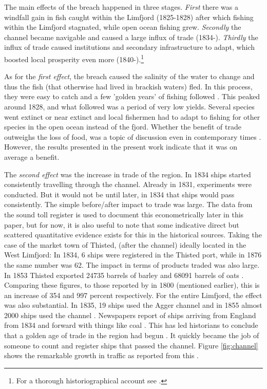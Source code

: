 \documentclass[11pt]{article}
\begin{document}
The main effects of the breach happened in three stages. \textit{First} there was a windfall gain in fish caught within the Limfjord (1825-1828) after which fishing within the Limfjord stagnated, while open ocean fishing grew. \textit{Secondly} the channel became navigable and caused a large influx of trade (1834-). \textit{Thirdly} the influx of trade caused institutions and secondary infrastructure to adapt, which boosted local prosperity even more (1840-).\footnote{For a thorough historiographical account see \cite{Poulsen2022}.}

As for the \textit{first effect}, the breach caused the salinity of the water to change and thus the fish (that otherwise had lived in brackish waters) fled. In this process, they were easy to catch and a few 'golden years' of fishing followed \citep{Poulsen2007}. This peaked around 1828, and what followed was a period of very low yields. Several species went extinct or near extinct \citep{Poulsen2019} and local fishermen had to adapt to fishing for other species in the open ocean instead of the fjord. Whether the benefit of trade outweighs the loss of food, was a topic of discussion even in contemporary times \citep[p. 1]{petersen1853oplysende}. However, the results presented in the present work indicate that it was on average a benefit.

The \textit{second effect} was the increase in trade of the region. In 1834 ships started consistently travelling through the channel. Already in 1831, experiments were conducted. But it would not be until later, in 1834 that ships would pass consistently. The simple before/after impact to trade was large. The data from the sound toll register is used to document this econometrically later in this paper, but for now, it is also useful to note that some indicative direct but scattered quantitative evidence exists for this in the historical sources. Taking the case of the market town of Thisted, (after the channel) ideally located in the West Limfjord: In 1834, 6 ships were registered in the Thisted port, while in 1876 the same number was 62. The impact in terms of products traded was also large. In 1853 Thisted exported 24735 barrels of barley and 68091 barrels of oats \citep[p. 153-159]{ThistedLokalhistorie1974}. Comparing these figures, to those reported by \cite{Aagard1802} in 1800 (mentioned earlier), this is an increase of 354 and 997 percent respectively. For the entire Limfjord, the effect was also substantial. In 1835, 19 ships used the Agger channel and in 1855 almost 2000 ships used the channel \citep{Svalgaard1977}. Newspapers report of ships arriving from England from 1834 and forward with things like coal \citep{ThistedAmtsavis1834, RoskildeAmt1836, ViborgStift1852}. This has led historians to conclude that a golden age of trade in the region had begun \citep{Poulsen2019, Ravn1993}. It quickly became the job of someone to count and register ships that passed the channel. Figure \ref{fig:channel} shows the remarkable growth in traffic as reported from this \citep{Svalgaard1977}.
\end{document}
